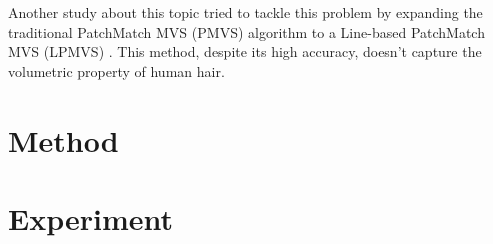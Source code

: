\documentclass[12pt]{article}
\begin{document}
  Another study about this topic tried to tackle this problem by expanding the traditional PatchMatch MVS (PMVS) algorithm to a Line-based PatchMatch MVS (LPMVS) \cite{nam_strand-accurate_nodate}. This method, despite its high accuracy, doesn't capture the volumetric property of human hair.

  \section{Method}

  \section{Experiment}
  

  \printbibliography
\end{document}
